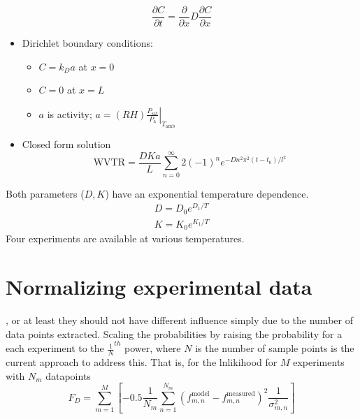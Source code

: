 \documentclass{tufte-handout}
\begin{document}
\begin{equation} \frac{\partial C}{\partial t} =
    \frac{\partial}{\partial x} D \frac{\partial C}{\partial x}
\end{equation}

\begin{itemize}
  \item Dirichlet boundary conditions:
      \begin{itemize}
          \item $C=k_Da$ at $x=0$
          \item $C=0$ at $x=L$
          \item $a$ is activity; $a = (RH)\left.\frac{P_{\mathrm{sat}}}{P_{\mathrm{a}}}\right|_{T_\mathrm{amb}}$
        \end{itemize}
   \item Closed form solution 
       \begin{equation}
           \mathrm{WVTR} = \frac{DKa}{L}\sum_{n=0}^{\infty} 2(-1)^ne^{-Dn^2\pi^2(t-t_0)/l^2}
       \end{equation}
\end{itemize}

Both parameters ($D,K$) have an exponential temperature dependence.
\begin{gather}
        D = D_0 e^{D_1/T}\\
        K = K_0 e^{K_1/T}
\end{gather}
Four experiments are available at various temperatures. 

\section{Normalizing experimental data}
, or at least they
should not have different influence simply due to the number of data points
extracted. Scaling the probabilities by raising the probability for a each
experiment to the $\frac{1}{N}^{th}$ power, where $N$ is the number of sample
points is the current approach to address this. That is, for the lnlikihood for
$M$ experiments with $N_m$ datapoints
\begin{equation}
    F_D = \sum_{m=1}^{M} \left[ -0.5\frac{1}{N_m} \sum_{n=1}^{N_m} (f_{m,n}^{\mathrm{model}} - f_{m,n}^{\mathrm{measured}})^2 \frac{1}{\sigma_{m,n}^2} \right]
\end{equation}
\end{document}
